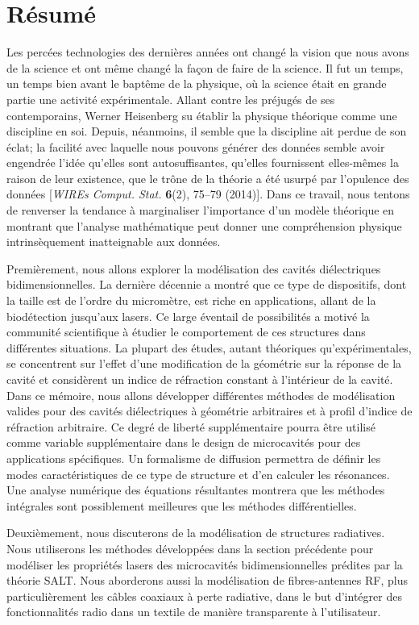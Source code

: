 \chapter*{Résumé}
Les percées technologies des dernières années ont changé
la vision que nous avons de la science et ont même changé
la façon de faire de la science. Il fut un temps, un temps
bien avant le baptême de la physique, où la science était
en grande partie une activité expérimentale. Allant 
contre les préjugés de ses contemporains, Werner
Heisenberg su établir la physique théorique comme une
discipline en soi. Depuis, néanmoins, il semble que la
discipline ait perdue de son éclat; la facilité
avec laquelle nous pouvons générer des données semble avoir
engendrée l'idée qu'elles sont autosuffisantes, 
qu'elles fournissent elles-mêmes la raison de leur existence, 
que le trône de la théorie a été usurpé par l'opulence
des données [\textit{WIREs Comput. Stat.} \textbf{6}(2), 75--79 (2014)]. 
Dans ce travail, nous tentons de renverser
la tendance à marginaliser l'importance d'un modèle 
théorique en montrant que l'analyse mathématique peut donner une 
compréhension physique intrinsèquement inatteignable 
aux données. 

Premièrement, nous allons explorer la modélisation des
cavités diélectriques bidimensionnelles. La dernière
décennie a montré que ce type de dispositifs, dont la 
taille est de l'ordre du micromètre, est riche en applications, 
allant de la biodétection jusqu'aux lasers. Ce large éventail de
possibilités a motivé la communité scientifique à étudier
le comportement de ces structures dans différentes situations.
La plupart des études, autant théoriques qu'expérimentales, 
se concentrent sur l'effet d'une modification de la géométrie 
sur la réponse de la cavité et considèrent un 
indice de réfraction constant à l'intérieur de la cavité. 
Dans ce mémoire, nous allons développer différentes méthodes
de modélisation valides pour des cavités diélectriques à géométrie
arbitraires et à profil d'indice de réfraction arbitraire. Ce
degré de liberté supplémentaire pourra être utilisé comme variable
supplémentaire dans le design de microcavités pour des applications
spécifiques. 
Un formalisme de diffusion permettra de définir les modes caractéristiques
de ce type de structure et d'en calculer les résonances. Une analyse
numérique des équations résultantes montrera que les méthodes intégrales
sont possiblement meilleures que les méthodes différentielles.

Deuxièmement, nous discuterons de la modélisation de structures
radiatives. Nous utiliserons les méthodes développées dans la section
précédente pour modéliser les propriétés lasers des microcavités
bidimensionnelles prédites par la théorie SALT. Nous aborderons
aussi la modélisation de fibres-antennes RF, plus particulièrement
les câbles coaxiaux à perte radiative, dans le but d'intégrer
des fonctionnalités radio dans un textile de manière transparente
à l'utilisateur. 
